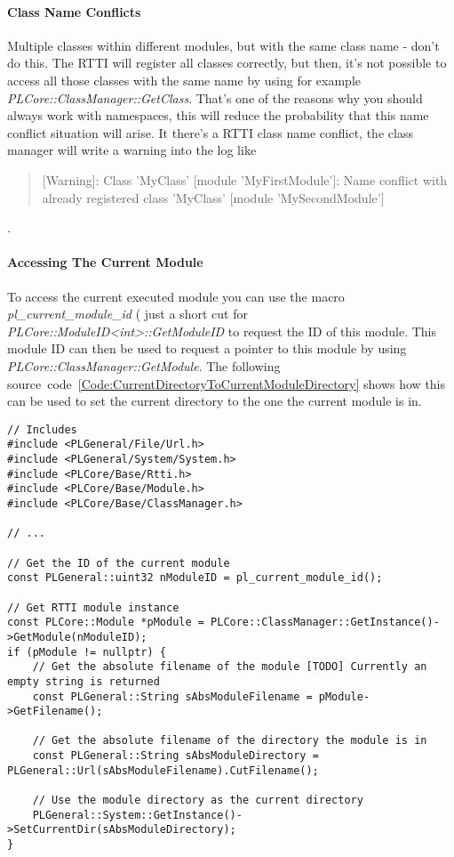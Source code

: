 \paragraph{Class Name Conflicts}
Multiple classes within different modules, but with the same class name - don't do this. The RTTI will register all classes correctly, but then, it's not possible to access all those classes with the same name by using for example \emph{PLCore::ClassManager::GetClass}. That's one of the reasons why you should always work with namespaces, this will reduce the probability that this name conflict situation will arise. It there's a RTTI class name conflict, the class manager will write a warning into the log like
\begin{quote}[Warning]: Class 'MyClass' [module 'MyFirstModule']: Name conflict with already registered class 'MyClass' [module 'MySecondModule']\end{quote}.


\paragraph{Accessing The Current Module}
To access the current executed module you can use the macro \emph{pl\_current\_module\_id} ( just a short cut for \emph{PLCore::ModuleID<int>::GetModuleID} to request the ID of this module. This module ID can then be used to request a pointer to this module by using \emph{PLCore::ClassManager::GetModule}. The following source~code~\ref{Code:CurrentDirectoryToCurrentModuleDirectory} shows how this can be used to set the current directory to the one the current module is in.
\begin{lstlisting}[label=Code:CurrentDirectoryToCurrentModuleDirectory,caption={Setting the current directory to the one the current module is in}]
// Includes
#include <PLGeneral/File/Url.h>
#include <PLGeneral/System/System.h>
#include <PLCore/Base/Rtti.h>
#include <PLCore/Base/Module.h>
#include <PLCore/Base/ClassManager.h>

// ...

// Get the ID of the current module
const PLGeneral::uint32 nModuleID = pl_current_module_id();

// Get RTTI module instance
const PLCore::Module *pModule = PLCore::ClassManager::GetInstance()->GetModule(nModuleID);
if (pModule != nullptr) {
	// Get the absolute filename of the module [TODO] Currently an empty string is returned
	const PLGeneral::String sAbsModuleFilename = pModule->GetFilename();

	// Get the absolute filename of the directory the module is in
	const PLGeneral::String sAbsModuleDirectory = PLGeneral::Url(sAbsModuleFilename).CutFilename();

	// Use the module directory as the current directory
	PLGeneral::System::GetInstance()->SetCurrentDir(sAbsModuleDirectory);
}
\end{lstlisting}




